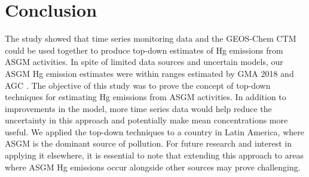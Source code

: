 \section{Conclusion}\label{c3_conclusion}
\begin{flushleft}
The study showed that time series monitoring data and the GEOS-Chem CTM could be used together to produce top-down estimates of Hg emissions from ASGM activities. In spite of limited data sources and uncertain models, our ASGM Hg emission estimates were within ranges estimated by GMA 2018 \cite{united_nations_environment_programme_technical_2019,steenhuisen_development_2019} and AGC \cite{agc_reporte_2017}. The objective of this study was to prove the concept of top-down techniques for estimating Hg emissions from ASGM activities. In addition to improvements in the model, more time series data would help reduce the uncertainty in this approach and potentially make mean concentrations more useful. We applied the top-down techniques to a country in Latin America, where ASGM is the dominant source of pollution. For future research and interest in applying it elsewhere, it is essential to note that extending this approach to areas where ASGM Hg emissions occur alongside other sources may prove challenging.
 
\end{flushleft}
